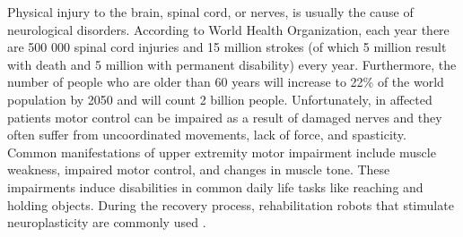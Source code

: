 %
%
%
Physical injury to the brain, spinal cord, or nerves, is usually the cause of neurological disorders. According to World Health Organization, each year there are 500 000 spinal cord injuries and 15 million strokes (of which 5 million result with death and 5 million with permanent disability) every year. Furthermore, the number of people who are older than 60 years will increase to 22\% of the world population by 2050 and will count 2 billion people. Unfortunately, in affected patients motor control can be impaired as a result of damaged nerves and they often suffer from uncoordinated movements, lack of force, and spasticity. Common manifestations of upper extremity motor impairment include muscle weakness, impaired motor control, and changes in muscle tone. These impairments induce disabilities in common daily life tasks like reaching and holding objects. During the recovery process, rehabilitation robots that stimulate neuroplasticity are commonly used \citep{VacaBenitez2013, Dipietro2005, Marchal-Crespo2009, Cesqui2013}. 

